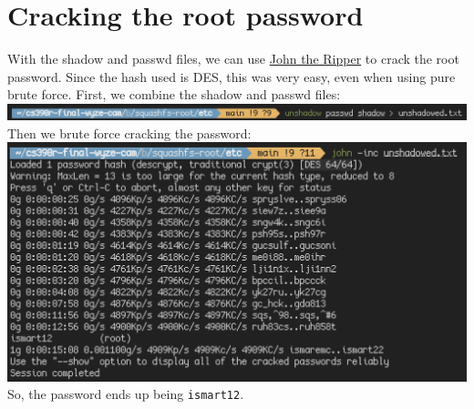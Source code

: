 \documentclass[a4paper, 11pt]{article}
\begin{document}
\section{Cracking the root password}
With the shadow and passwd files, we can use \href{https://www.openwall.com/john/}{John the Ripper} to crack the root password. Since the hash used is DES, this was very easy, even when using pure brute force.
First, we combine the shadow and passwd files:\newline
\includegraphics[scale=0.5]{screen}\newline
Then we brute force cracking the password:\newline
\includegraphics[scale=0.5]{screen2}\newline
So, the password ends up being \verb|ismart12|.
\end{document}
